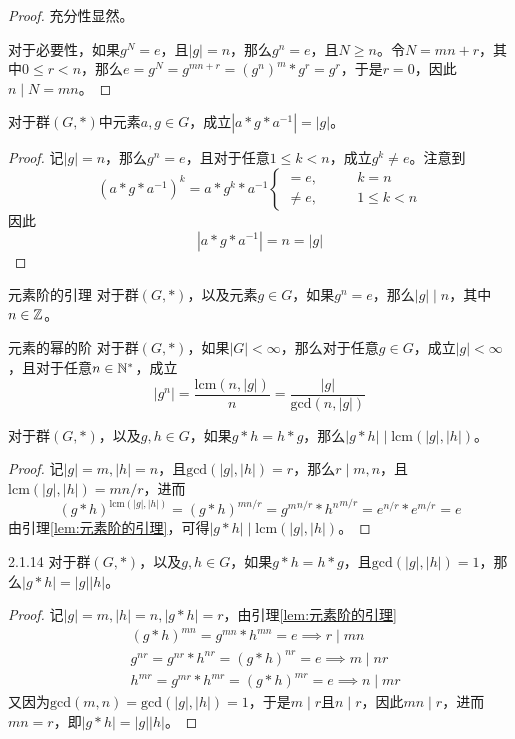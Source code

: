 \begin{proof}
	充分性显然。
	
	对于必要性，如果$g^N=e$，且$|g|=n$，那么$g^n=e$，且$N\ge n$。令$N=mn+r$，其中$0\le r<n$，那么$e=g^N=g^{mn+r}=(g^n)^m*g^r=g^r$，于是$r=0$，因此$n\mid N=mn$。
\end{proof}

\begin{proposition}
	对于群$(G,*)$中元素$a,g\in G$，成立$|a*g*a^{-1}|=|g|$。
\end{proposition}

\begin{proof}
	记$|g|=n$，那么$g^n=e$，且对于任意$1\le k<n$，成立$g^k\ne e$。注意到
	$$
	(a*g*a^{-1})^k=a*g^k*a^{-1}\begin{cases}
		=e,\qquad & k=n\\
		\ne e,\qquad & 1\le k <n
	\end{cases}
	$$
	因此
	$$
	|a*g*a^{-1}|=n=|g|
	$$
\end{proof}

\begin{lemma}{}{元素阶的引理}
	对于群$(G,*)$，以及元素$g\in G$，如果$g^n=e$，那么$|g|\mid n$，其中$n\in\mathbb{Z}$。
\end{lemma}

\begin{proposition}{}{元素的幂的阶}
	对于群$(G,*)$，如果$|G|<\infty$，那么对于任意$g\in G$，成立$|g|<\infty$，且对于任意$n\in\mathbb{N}^*$，成立
	$$
	|g^n|=\frac{\mathrm{lcm}(n,|g|)}{n}=\frac{|g|}{\mathrm{gcd}(n,|g|)}
	$$
\end{proposition}

\begin{proposition}
	对于群$(G,*)$，以及$g,h\in G$，如果$g*h=h*g$，那么$|g*h|\mid \mathrm{lcm}(|g|,|h|)$。
\end{proposition}

\begin{proof}
	记$|g|=m,|h|=n$，且$\mathrm{gcd}(|g|,|h|)=r$，那么$r\mid m,n$，且$\mathrm{lcm}(|g|,|h|)=mn/r$，进而
	$$
	(g*h)^{\mathrm{lcm}(|g|,|h|)}=(g*h)^{mn/r}={g^{m}}^{n/r}*{h^{n}}^{m/r}=e^{n/r}*e^{m/r}=e
	$$
	由引理\ref{lem:元素阶的引理}，可得$|g*h|\mid \mathrm{lcm}(|g|,|h|)$。
\end{proof}

\begin{proposition}{}{2.1.14}
	对于群$(G,*)$，以及$g,h\in G$，如果$g*h=h*g$，且$\mathrm{gcd}(|g|,|h|)=1$，那么$|g*h|=|g||h|$。
\end{proposition}

\begin{proof}
	记$|g|=m,|h|=n,|g*h|=r$，由引理\ref{lem:元素阶的引理}
	\begin{align*}
		&(g*h)^{mn}=g^{mn}*h^{mn}=e\implies r\mid mn\\
		&g^{nr}=g^{nr}*h^{nr}=(g*h)^{nr}=e\implies m\mid nr\\
		&h^{mr}=g^{mr}*h^{mr}=(g*h)^{mr}=e\implies n\mid mr
	\end{align*}
	又因为$\mathrm{gcd}(m,n)=\mathrm{gcd}(|g|,|h|)=1$，于是$m\mid r$且$n\mid r$，因此$mn\mid r$，进而$mn=r$，即$|g*h|=|g||h|$。
\end{proof}

